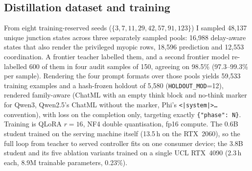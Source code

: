 \subsection{Distillation dataset and training}\label{sec:imp-dataset}
From eight training-reserved seeds ($\{3, 7, 11, 29, 42, 57, 91, 123\}$) I
sampled 48{,}137 unique junction states across three separately sampled
pools: 16{,}988 delay-aware states that also render the privileged myopic
rows, 18{,}596 prediction and 12{,}553 coordination. A frontier teacher
labelled them, and a second frontier model re-labelled 600 of them in four
audit samples of 150, agreeing on 98.5\% (97.3--99.3\% per sample).
Rendering the four prompt formats over those pools yields 59{,}533
training examples and a hash-frozen holdout of 5{,}580
(\texttt{HOLDOUT\_MOD}=12), rendered family-aware (ChatML with an empty
think block and no-think marker for Qwen3, Qwen2.5's ChatML without the
marker, Phi's \texttt{<|system|>\ldots<|end|>} convention), with loss on
the completion only, targeting exactly \texttt{\{"phase": N\}}. Training
is QLoRA $r{=}16$, NF4 double quantisation, fp16 compute. The 0.6B student
trained on the serving machine itself (13.5\,h on the RTX~2060), so the
full loop from teacher to served controller fits on one consumer device;
the 3.8B student and its five ablation variants trained on a single UCL
RTX~4090 (2.3\,h each, 8.9M trainable parameters, 0.23\%).

